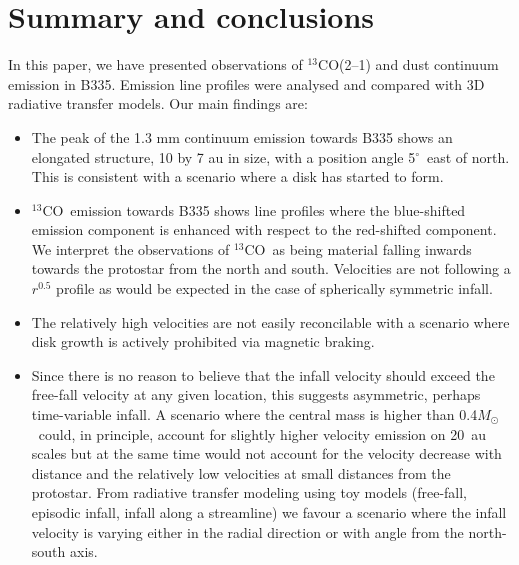 \documentclass{aa}
\newcommand{\trettenco}{$^{13}$CO\xspace}
\newcommand{\adeg}{$^{\circ}$}
\newcommand{\msun}{\ensuremath{M_{\odot}}\xspace}
\begin{document}
\section{Summary and conclusions}
\label{sec:conclude}
In this paper, we have presented observations of \trettenco (2--1) and dust continuum emission in B335. Emission line profiles were analysed and compared with 3D radiative transfer models. Our main findings are:
\begin{itemize}
    \item The peak of the 1.3 mm continuum emission towards B335 shows an elongated structure, 10 by 7 au in size, with a position angle 5\adeg\ east of north. This is consistent with a scenario where a disk has started to form.
    \item \trettenco\ emission towards B335 shows line profiles where the blue-shifted emission component is enhanced with respect to the red-shifted component. We interpret the observations of \trettenco\ as being material falling inwards towards the protostar from the north and south. Velocities are not following a $r^{0.5}$ profile as would be expected in the case of spherically symmetric infall.
    \item The relatively high velocities are not easily reconcilable with a scenario where disk growth is actively prohibited via magnetic braking.
    \item Since there is no reason to believe that the infall velocity should exceed the free-fall velocity at any given location, this suggests asymmetric, perhaps time-variable infall. A scenario where the central mass is higher than 0.4\msun\ could, in principle, account for slightly higher velocity emission on 20~au scales but at the same time would not account for the velocity decrease with distance and the relatively low velocities at small distances from the protostar. From radiative transfer modeling using toy models (free-fall, episodic infall, infall along a streamline) we favour a scenario where the infall velocity is varying either in the radial direction or with angle from the north-south axis.
\end{itemize}
\end{document}

